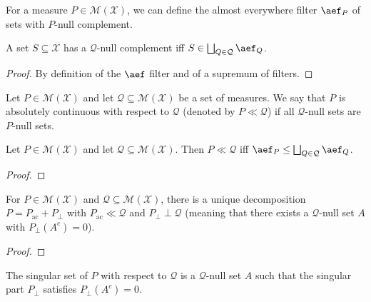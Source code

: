 For a measure $P \in \mathcal{M}(\mathcal{X})$, we can define the almost everywhere filter $\aef_P$ of sets with $P$-null complement.

\begin{lemma}\label{lem:aeSet_filter}
  \leanok
A set $S \subseteq \mathcal{X}$ has a $\mathcal{Q}$-null complement iff $S \in \bigsqcup_{Q \in \mathcal{Q}} \aef_Q$.
\end{lemma}

\begin{proof}\leanok
By definition of the $\aef$ filter and of a supremum of filters.
\end{proof}


\begin{definition}\label{def:acSet}
  Let $P \in \mathcal{M}(\mathcal{X})$ and let $\mathcal{Q} \subseteq \mathcal{M}(\mathcal{X})$ be a set of measures.
  We say that $P$ is absolutely continuous with respect to $\mathcal{Q}$ (denoted by $P \ll \mathcal{Q}$) if all $\mathcal{Q}$-null sets are $P$-null sets.
\end{definition}


\begin{lemma}\label{lem:acSet_iff}
Let $P \in \mathcal{M}(\mathcal{X})$ and let $\mathcal{Q} \subseteq \mathcal{M}(\mathcal{X})$.
Then $P \ll \mathcal{Q}$ iff $\aef_P \le \bigsqcup_{Q \in \mathcal{Q}} \aef_Q$.
\end{lemma}

\begin{proof}

\end{proof}


\begin{lemma}\label{lem:RN_acSet}
For $P \in \mathcal{M}(\mathcal{X})$ and $\mathcal{Q} \subseteq \mathcal{M}(\mathcal{X})$, there is a unique decomposition $P = P_{\mathrm{ac}} + P_{\perp}$ with $P_{\mathrm{ac}} \ll \mathcal{Q}$ and $P_{\perp} \perp \mathcal{Q}$ (meaning that there exists a $\mathcal{Q}$-null set $A$ with $P_{\perp}(A^c) = 0$).
\end{lemma}

\begin{proof}

\end{proof}


\begin{definition}\label{def:singularSet}
The singular set of $P$ with respect to $\mathcal{Q}$ is a $\mathcal{Q}$-null set $A$ such that the singular part $P_{\perp}$ satisfies $P_{\perp}(A^c) = 0$.
\end{definition}


